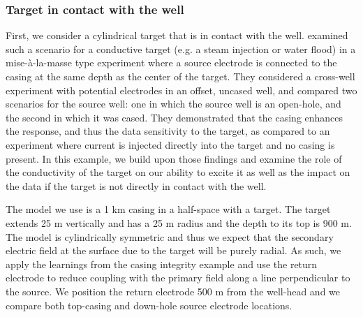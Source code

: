 \documentclass[extra,mreferee]{gji}
\begin{document}
\subsubsection{Target in contact with the well}

First, we consider a cylindrical target that is in contact with the well. \cite{Schenkel1994} examined such a scenario for a conductive target (e.g. a steam injection or water flood) in a mise-\`a-la-masse type experiment where a source electrode is connected to the casing at the same depth as the center of the target. They considered a cross-well experiment with potential electrodes in an offset, uncased well, and compared two scenarios for the source well: one in which the source well is an open-hole, and the second in which it was cased. They demonstrated that the casing enhances the response, and thus the data sensitivity to the target, as compared to an experiment where current is injected directly into the target and no casing is present. In this example, we build upon those findings and examine the role of the conductivity of the target on our ability to excite it as well as the impact on the data if the target is not directly in contact with the well.

The model we use is a 1 km casing in a half-space with a target. The target extends 25 m vertically and has a 25 m radius and the depth to its top is 900 m. The model is cylindrically symmetric and thus we expect that the secondary electric field at the surface due to the target will be purely radial. As such, we apply the learnings from the casing integrity example and use the return electrode to reduce coupling with the primary field along a line perpendicular to the source. We position the return electrode 500 m from the well-head and we compare both top-casing and down-hole source electrode locations.
\end{document}
